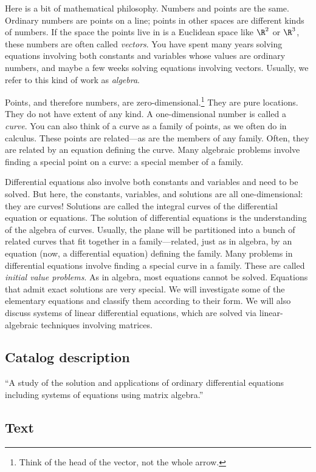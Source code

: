 \documentclass[symmetric]{tufte-handout}
\begin{document}
Here is a bit of mathematical philosophy. Numbers and points are the same.
Ordinary numbers are points on a line; points in other spaces are different
kinds of numbers. If the space the points live in is a Euclidean space like
$\R^2$ or $\R^3$, these numbers are often called \emph{vectors}. You have
spent many years solving equations involving both constants and variables
whose values are ordinary numbers, and maybe a few weeks solving equations
involving vectors. Usually, we refer to this kind of work as \emph{algebra}.

Points, and therefore numbers, are zero-dimensional.\footnote{Think of the head
of the vector, not the whole arrow.} They are pure locations. They do not
have extent of any kind. A one-dimensional number is called a \emph{curve}.
You can also think of a curve as a family of points, as we often do in
calculus. These points are related—as are the members of any family. Often,
they are related by an equation defining the curve. Many algebraic problems
involve finding a special point on a curve: a special member of a family.

Differential equations also involve both constants and variables and need to
be solved. But here, the constants, variables, and solutions are all 
one-dimensional: they are curves! Solutions are called the integral curves 
of the differential
equation or equations. The solution of differential equations is the
understanding of the algebra of curves. Usually, the plane will be partitioned
into a bunch of related curves that fit together in a family—related, just as
in algebra, by an equation (now, a differential equation) defining the family.
Many problems in differential equations involve finding a special curve in a
family. These are called \emph{initial value problems}. As in algebra, most
equations cannot be solved. Equations that admit exact solutions are very
special. We will investigate some of the elementary equations and classify
them according to their form. We will also discuss systems of linear
differential equations, which are solved via linear-algebraic techniques
involving matrices.

\subsection{Catalog description}

“A study of the solution and applications of ordinary differential equations
including systems of equations using matrix algebra.”

\subsection{Text}
\end{document}

